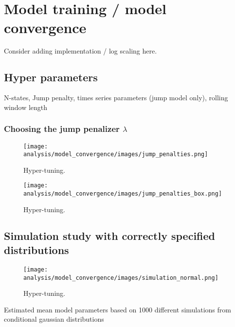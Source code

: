 \newpage

\section{Model training / model convergence}

Consider adding implementation / log scaling here.
 
\subsection{Hyper parameters}
 
N-states, Jump penalty, times series parameters (jump model only), rolling window length
 
\subsubsection{Choosing the jump penalizer $\lambda$}

\begin{figure}[H] 
    \centering
    \texttt{[image: analysis/model\_convergence/images/jump\_penalties.png]}
    \caption{Hyper-tuning.}
    \label{fig:jump_penalties}
\end{figure}

\begin{figure}[H] 
    \centering
    \texttt{[image: analysis/model\_convergence/images/jump\_penalties\_box.png]}
    \caption{Hyper-tuning.}
    \label{fig:jump_penalties}
\end{figure}


\subsection{Simulation study with correctly specified distributions}

\begin{figure}[H] 
    \centering
    \texttt{[image: analysis/model\_convergence/images/simulation\_normal.png]}
    \caption{Hyper-tuning.}
    \label{fig:jump_penalties}
\end{figure}

\begin{table}[H]
\centering
\caption{Estimated mean model parameters based on 1000 different simulations from conditional gaussian distributions}

\end{table}

 
